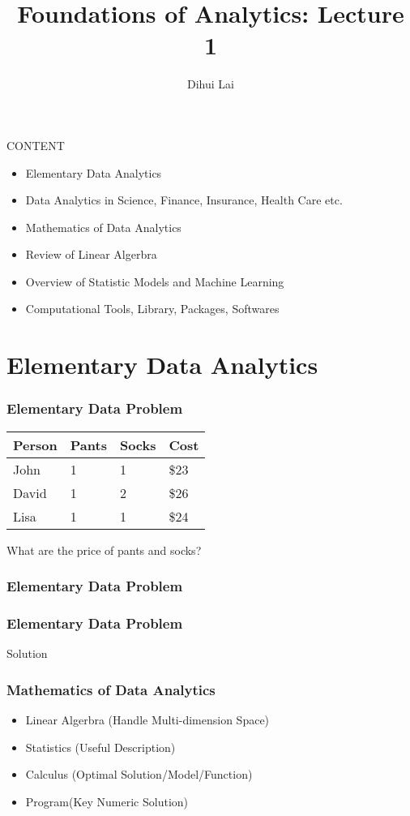 \documentclass[notheorems, aspectratio=54]{beamer}
\title{Foundations of Analytics: Lecture 1}
\author{Dihui Lai}
\institute[WUSTL]{dlai@wustl.edu}
\begin{document}
\begin{frame}
    \titlepage
\end{frame}

\begin{frame}
CONTENT
\begin{itemize}
\item Elementary Data Analytics
\item Data Analytics in Science, Finance, Insurance, Health Care etc. 
\item Mathematics of Data Analytics
\item Review of Linear Algerbra 
\item Overview of Statistic Models and Machine Learning
\item Computational Tools, Library, Packages, Softwares
\end{itemize}
\end{frame}

\section{Elementary Data Analytics}
\begin{frame}
\frametitle{Elementary Data Problem}
\begin{table}[]
\begin{tabular}{llll}
Person &Pants & Socks &Cost\\
\hline
John	&1	&1 &\$23\\
David	&1	&2  &\$26\\
Lisa	&1	&1  &\$24\\
\hline
\end{tabular}
\end{table}
What are the price of pants and socks?
\end{frame}



\frametitle{Elementary Data Problem}
\begin{frame}
\frametitle{Elementary Data Problem}
\begin{center}
Solution
\end{center}

\end{frame}


\begin{frame}
\frametitle{Mathematics of Data Analytics}
\begin{itemize}
\item Linear Algerbra (Handle Multi-dimension Space)
\item Statistics (Useful Description)
\item Calculus (Optimal Solution/Model/Function)
\item Program(Key Numeric Solution)
\end{itemize}
\end{frame}
\end{document}
